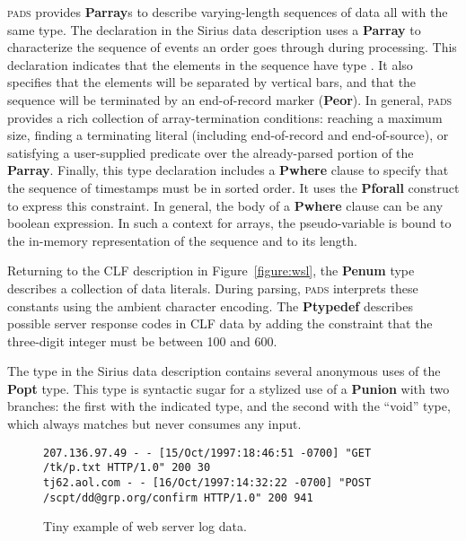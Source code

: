 \documentclass{sigplanconf}
\newcommand{\dibbler}{Sirius}
\newcommand{\figref}[1]{Figure~\ref{#1}}
\newcommand{\bftt}[1]{{\ttfamily\bfseries{#1}}}
\newcommand{\kw}[1]{\bftt{#1}}
\newcommand{\pads}{\textsc{pads}}
\begin{document}
\pads{} provides \kw{Parray}s to describe varying-length sequences of data all 
with the same type.  The  declaration in the \dibbler{} data description
uses a \kw{Parray} to characterize the sequence of events an
order goes through during processing.  This declaration indicates that the elements
in the sequence have type .  It also specifies that the elements will
be separated by vertical bars, and that the sequence will be terminated by 
an end-of-record marker (\kw{Peor}).  In general, \pads{} provides a rich collection
of array-termination conditions: reaching a maximum size, finding a terminating
literal (including end-of-record and end-of-source),
or satisfying a user-supplied predicate over the already-parsed portion of 
the \kw{Parray}.  Finally, this type declaration includes a \kw{Pwhere} clause
to specify that the sequence of timestamps must be in sorted order.
It uses the \kw{Pforall} construct to express this constraint.
In general, the body of a \kw{Pwhere} clause can be any boolean expression.
In such a context for arrays, the pseudo-variable  is bound to the in-memory representation of the sequence and  to its length.

Returning to the CLF description in \figref{figure:wsl}, the \kw{Penum} type  describes
a collection of data literals.  During parsing, \pads{} interprets these
constants using the ambient character encoding.  The \kw{Ptypedef} 
 describes possible server response codes in CLF data by adding
the constraint that the three-digit integer must be between 100 and 600.

The  type in the \dibbler{} data description contains several
anonymous uses of the \kw{Popt} type.  This type is syntactic sugar for a 
stylized use of a \kw{Punion} with two branches: the first with the indicated type, and the second with the ``void'' type, which  
always matches but never consumes any input.

\setlength{\floatsep}{0pt}
\setlength{\dblfloatsep}{0pt}
\setcounter{totalnumber}{4}
\setcounter{dbltopnumber}{2}
\begin{figure*}[t!]
\begin{small}
\begin{center}
\begin{verbatim}
207.136.97.49 - - [15/Oct/1997:18:46:51 -0700] "GET /tk/p.txt HTTP/1.0" 200 30
tj62.aol.com - - [16/Oct/1997:14:32:22 -0700] "POST /scpt/dd@grp.org/confirm HTTP/1.0" 200 941
\end{verbatim}
\caption{Tiny example of web server log data.}
\label{figure:clf-records}
\end{center}
\end{small}
\end{figure*}
\end{document}
